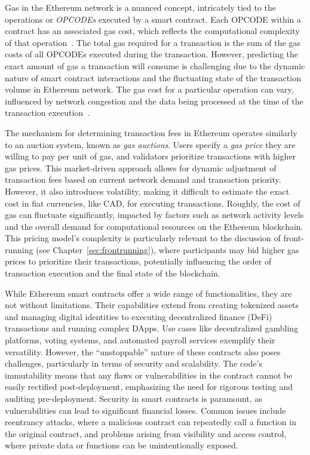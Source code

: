 Gas in the Ethereum network is a nuanced concept, intricately tied to the operations or \textit{OPCODEs} executed by a smart contract. Each OPCODE within a contract has an associated gas cost, which reflects the computational complexity of that operation~\cite{opcodeseth}. The total gas required for a transaction is the sum of the gas costs of all OPCODEs executed during the transaction. However, predicting the exact amount of gas a transaction will consume is challenging due to the dynamic nature of smart contract interactions and the fluctuating state of the transaction volume in Ethereum network. The gas cost for a particular operation can vary, influenced by network congestion and the data being processed at the time of the transaction execution~\cite{signer2018gas}.

The mechanism for determining transaction fees in Ethereum operates similarly to an auction system, known as \textit{gas auctions}. Users specify a \textit{gas price} they are willing to pay per unit of gas, and validators prioritize transactions with higher gas prices. This market-driven approach allows for dynamic adjustment of transaction fees based on current network demand and transaction priority. However, it also introduces volatility, making it difficult to estimate the exact cost in fiat currencies, like CAD, for executing transactions. Roughly, the cost of gas can fluctuate significantly, impacted by factors such as network activity levels and the overall demand for computational resources on the Ethereum blockchain. This pricing model's complexity is particularly relevant to the discussion of front-running (see Chapter~\ref{sec:frontrunning}), where participants may bid higher gas prices to prioritize their transactions, potentially influencing the order of transaction execution and the final state of the blockchain.

While Ethereum smart contracts offer a wide range of functionalities, they are not without limitations. Their capabilities extend from creating tokenized assets and managing digital identities to executing decentralized finance (DeFi) transactions and running complex DApps. Use cases like decentralized gambling platforms, voting systems, and automated payroll services exemplify their versatility. However, the ``unstoppable'' nature of these contracts also poses challenges, particularly in terms of security and scalability. The code's immutability means that any flaws or vulnerabilities in the contract cannot be easily rectified post-deployment, emphasizing the need for rigorous testing and auditing pre-deployment. Security in smart contracts is paramount, as vulnerabilities can lead to significant financial losses. Common issues include reentrancy attacks, where a malicious contract can repeatedly call a function in the original contract, and problems arising from visibility and access control, where private data or functions can be unintentionally exposed. 

